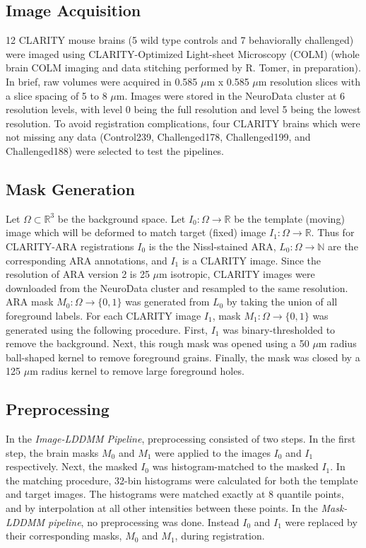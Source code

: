 \documentclass[]{spie}  %
\begin{document}
\subsection{Image Acquisition}
12 CLARITY mouse brains (5 wild type controls and 7 behaviorally challenged) were imaged using CLARITY-Optimized Light-sheet Microscopy (COLM) (whole brain COLM imaging and data stitching performed by R. Tomer, in preparation).
In brief, raw volumes were acquired in 0.585 $\mu$m x 0.585 $\mu$m resolution slices with a slice spacing of 5 to 8 $\mu$m.
Images were stored in the NeuroData cluster at 6 resolution levels, with level 0 being the full resolution and level 5 being the lowest resolution.
To avoid registration complications, four CLARITY brains which were not missing any data (Control239, Challenged178, Challenged199, and Challenged188) were selected to test the pipelines.

\subsection{Mask Generation}
Let $\Omega \subset \mathbb{R}^3$ be the background space.
Let $I_0: \Omega \rightarrow \mathbb{R}$ be the template (moving) image which will be deformed to match target (fixed) image $I_1: \Omega \rightarrow \mathbb{R}$.
Thus for CLARITY-ARA registrations $I_0$ is the the Nissl-stained ARA, $L_0: \Omega \rightarrow \mathbb{N}$ are the corresponding ARA annotations, and $I_1$ is a CLARITY image.
Since the resolution of ARA version 2 is 25 $\mu$m isotropic, CLARITY images were downloaded from the NeuroData cluster and resampled to the same resolution.
ARA mask $M_0: \Omega \rightarrow \{0,1\}$ was generated from $L_0$ by taking the union of all foreground labels.
For each CLARITY image $I_1$, mask $M_1: \Omega \rightarrow \{0,1\}$ was generated using the following procedure.
First, $I_1$ was binary-thresholded to remove the background.
Next, this rough mask was opened using a 50 $\mu$m radius ball-shaped kernel to remove foreground grains.
Finally, the mask was closed by a 125 $\mu$m radius kernel to remove large foreground holes.


\subsection{Preprocessing}
In the \emph{Image-LDDMM Pipeline}, preprocessing consisted of two steps. 
In the first step, the brain masks $M_0$ and $M_1$ were applied to the images $I_0$ and $I_1$ respectively.
Next, the masked $I_0$ was histogram-matched to the masked $I_1$.
In the matching procedure, 32-bin histograms were calculated for both the template and target images.
The histograms were matched exactly at 8 quantile points, and by interpolation at all other intensities between these points.
In the \emph{Mask-LDDMM pipeline}, no preprocessing was done.
Instead $I_0$ and $I_1$ were replaced by their corresponding masks, $M_0$ and $M_1$, during registration.
\end{document}
